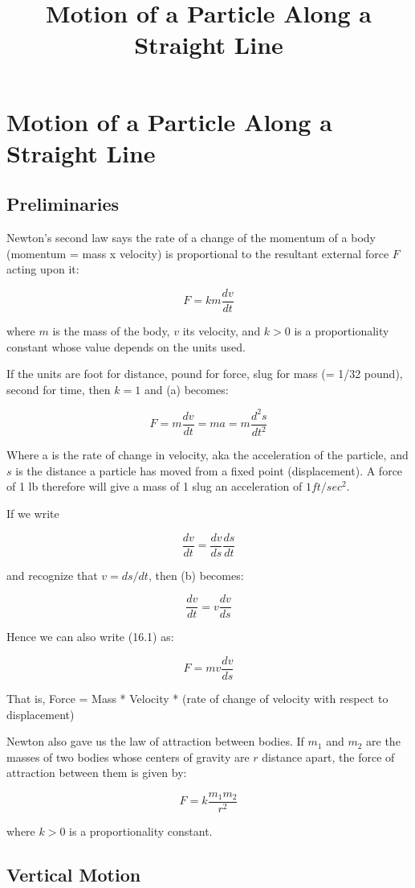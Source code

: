 \documentclass{article}
\title{Motion of a Particle Along a Straight Line}
\begin{document}
\section{Motion of a Particle Along a Straight Line}

\subsection{Preliminaries}

Newton's second law says the rate of a change of the momentum of a body (momentum = mass x velocity) is proportional to the resultant external force $F$ acting upon it:

\[ \tag{a} F = km\frac{dv}{dt} \]

where $m$ is the mass of the body, $v$ its velocity, and $k > 0$ is a proportionality constant whose value depends on the units used.

If the units are foot for distance, pound for force, slug for mass (= 1/32 pound), second for time, then $k=1$ and (a) becomes:

\[ \tag{16.1} F = m\frac{dv}{dt} = ma = m\frac{d^2s}{dt^2} \]

Where a is the rate of change in velocity, aka the acceleration of the particle, and $s$ is the distance a particle has moved from a fixed point (displacement). A force of 1 lb therefore will give a mass of 1 slug an acceleration of $1 ft/sec^2$.

If we write

\[ \tag{b} \frac{dv}{dt} = \frac{dv}{ds} \frac{ds}{dt} \]

and recognize that $v = ds/dt$, then (b) becomes:

\[ \tag{16.11} \frac{dv}{dt} = v\frac{dv}{ds} \]

Hence we can also write (16.1) as:

\[ \tag{16.111} F = mv\frac{dv}{ds} \]

That is, Force = Mass * Velocity * (rate of change of velocity with respect to displacement)

Newton also gave us the law of attraction between bodies. If $m_1$ and $m_2$ are the masses of two bodies whose centers of gravity are $r$ distance apart, the force of attraction between them is given by:

\[ \tag{16.12} F = k\frac{m_1 m_2}{r^2} \]

where $k > 0$ is a proportionality constant.

\subsection{Vertical Motion}
\end{document}
